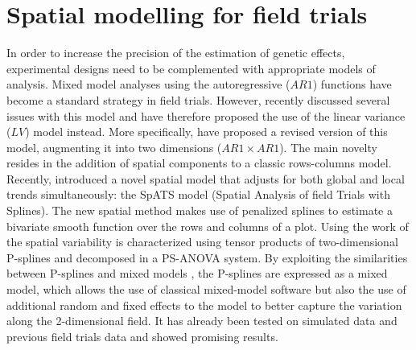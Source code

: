 \section{Spatial modelling for field trials}

In order to increase the precision of the estimation of genetic effects, experimental designs need to be complemented with appropriate models of analysis. Mixed model analyses using the autoregressive ($AR1$) functions   \parencite{cullis_spatial_1991} have become a standard strategy in field trials. 
However, \textcite{piepho_problems_2015} recently discussed several issues with this model and have therefore proposed the use of the linear variance ($LV$) model \parencite{williams_use_1988} instead. More specifically, \textcite{piepho_linear_2010} have proposed a revised version of this model, augmenting it into two dimensions ($AR1 \times AR1$). The main novelty resides in the addition of spatial components to a classic rows-columns model. Recently, 
\textcite{rodriguez-alvarez_correcting_2018} introduced a novel spatial model that adjusts for both global and local trends simultaneously: the SpATS model  (Spatial Analysis of field Trials with Splines). The new spatial method makes use of penalized splines \parencite{eilers_flexible_1996} to estimate a bivariate smooth function over the rows and columns of a plot. Using the work of \textcite{lee_efficient_2013,lee_hwang_smoothing_2010,lee_p-spline_2011} the spatial variability is characterized using tensor products of two-dimensional P-splines \parencite{dierckx_curve_1995} and decomposed in a PS-ANOVA system. By exploiting the similarities between P-splines and mixed models \parencite{currie_flexible_2002,durban_adjusting_2001, wand_smoothing_2003}, the P-splines are expressed as a mixed model, which allows the use of classical mixed-model software but also the use of additional random and fixed effects to the model to better capture the variation along the 2-dimensional field.
It has already been tested on simulated data \parencite{rodriguez-alvarez_correcting_2018} and previous field trials data \parencite{lado_increased_2013} and showed promising results.\\

